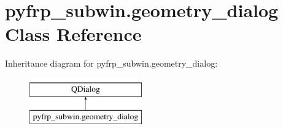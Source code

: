 \hypertarget{classpyfrp__subwin_1_1geometry__dialog}{\section{pyfrp\+\_\+subwin.\+geometry\+\_\+dialog Class Reference}
\label{classpyfrp__subwin_1_1geometry__dialog}
}
Inheritance diagram for pyfrp\+\_\+subwin.\+geometry\+\_\+dialog\+:\begin{figure}[H]
\begin{center}
\leavevmode
\includegraphics[height=2.000000cm]{classpyfrp__subwin_1_1geometry__dialog}
\end{center}
\end{figure}
